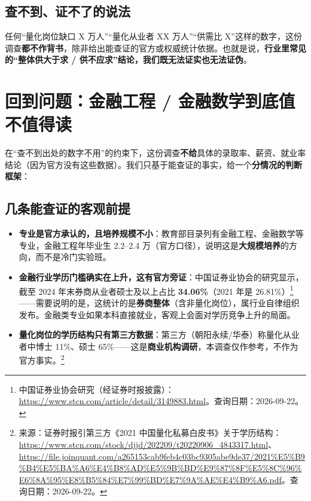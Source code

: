 \documentclass[UTF8,11pt]{ctexart}
\begin{document}
\subsection{查不到、证不了的说法}

任何“量化岗位缺口 X 万人”“量化从业者 XX 万人”“供需比 X”这样的数字，这份调查\textbf{都不作背书}，除非给出能查证的官方或权威统计依据。也就是说，\textbf{行业里常见的“整体供大于求 / 供不应求”结论，我们既无法证实也无法证伪}。

\section{回到问题：金融工程 / 金融数学到底值不值得读}

在“查不到出处的数字不用”的约束下，这份调查\textbf{不给}具体的录取率、薪资、就业率结论（因为官方没有这些数据）。我们只基于能查证的事实，给一个\textbf{分情况的判断框架}：

\subsection{几条能查证的客观前提}
\begin{itemize}[itemsep=2pt]
\item \textbf{专业是官方承认的，且培养规模不小}：教育部目录列有金融工程、金融数学等专业，金融工程年毕业生 2.2--2.4 万（官方口径），说明这是\textbf{大规模培养}的方向，而不是冷门实验班。
\item \textbf{金融行业学历门槛确实在上升，这有官方旁证}：中国证券业协会的研究显示，截至 2024 年末券商从业者硕士及以上占比 \textbf{34.06\%}（2021 年是 26.81\%）\footnote{中国证券业协会研究（经证券时报披露）：\url{https://www.stcn.com/article/detail/3149883.html}。查询日期：2026-09-22。}——需要说明的是，这统计的是\textbf{券商整体}（含非量化岗位），属行业自律组织发布。金融类专业如果本科直接就业，客观上会面对学历竞争上升的局面。
\item \textbf{量化岗位的学历结构只有第三方数据}：第三方（朝阳永续/华泰）称量化从业者中博士 11\%、硕士 65\%——这是\textbf{商业机构调研}，本调查仅作参考，不作为官方事实。\footnote{来源：证券时报引第三方《2021 中国量化私募白皮书》关于学历结构：\url{https://www.stcn.com/stock/djjd/202209/t20220906_4843317.html}、\url{https://file.joinquant.com/a265153cab9feb4c03bc9305abe9de37/2021\%E5\%B9\%B4\%E5\%BA\%A6\%E4\%B8\%AD\%E5\%9B\%BD\%E9\%87\%8F\%E5\%8C\%96\%E6\%8A\%95\%E8\%B5\%84\%E7\%99\%BD\%E7\%9A\%AE\%E4\%B9\%A6.pdf}。查询日期：2026-09-22。}
\end{itemize}
\end{document}
